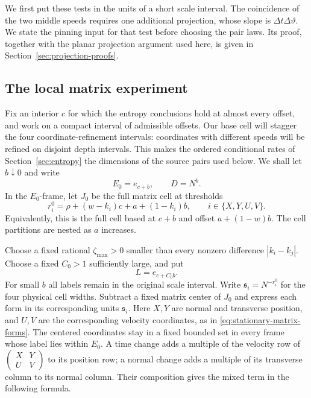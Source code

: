 We first put these tests in the units of a short scale interval. The
coincidence of the two middle speeds requires one additional projection,
whose slope is $\Delta t\Delta\vartheta$. We state the pinning input for
that test before choosing the pair laws. Its proof, together with the
planar projection argument used here, is given in
Section~\ref{sec:projection-proofs}.

\subsection{The local matrix experiment}

Fix an interior $c$ for which the entropy conclusions hold at almost
every offset, and work on a compact interval of admissible offsets.
Our base cell will stagger the four coordinate-refinement intervals:
coordinates with different speeds will be refined on disjoint depth
intervals. This makes the ordered conditional rates of
Section~\ref{sec:entropy} the dimensions of the source pairs used below.
We shall let $b\downarrow0$ and write
\[
 E_0=e_{c+b},\qquad D=N^b.
\]
In the $E_0$-frame, let $J_0$ be the full matrix cell at thresholds
\begin{equation}
 r_i^0=\rho+(w-k_i)c+a+(1-k_i)b,
 \qquad i\in\{X,Y,U,V\}.
\label{pr:rebase-thresholds}
\end{equation}
Equivalently, this is the full cell based at $c+b$ and offset
$a+(1-w)b$. The cell partitions are nested as $a$ increases.

Choose a fixed rational $\zeta_{\max}>0$ smaller than every nonzero
difference $|k_i-k_j|$. Choose a fixed $C_0>1$ sufficiently large,
and put
\begin{equation}
 L=e_{c+C_0b}.
\label{pr:fine-label}
\end{equation}
For small $b$ all labels remain in the original scale interval.
Write $\mathfrak s_i=N^{-r_i^0}$ for the four physical cell widths.
Subtract a fixed matrix center of $J_0$ and express each form in its
corresponding units $\mathfrak s_i$.
Here $X,Y$ are normal and transverse position, and $U,V$ are the
corresponding velocity coordinates, as in
\eqref{eq:stationary-matrix-forms}. The centered coordinates stay in a
fixed bounded set in every frame whose label lies within $E_0$.
A time change adds a multiple of the velocity row of
$\left(\begin{smallmatrix}X&Y\\ U&V\end{smallmatrix}\right)$
to its position row; a normal change adds a multiple of its transverse
column to its normal column. Their composition gives the mixed term
in the following formula.

